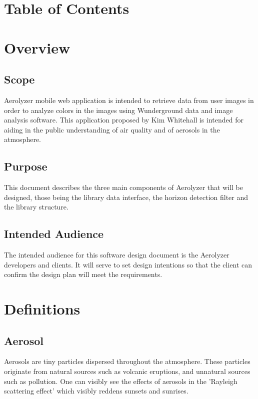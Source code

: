 \documentclass[onecolumn, draftclsnofoot,10pt, compsoc]{IEEEtran}
\begin{document}
\section{Table of Contents}
\tableofcontents


\clearpage

\begin{singlespace}
\section{Overview}
	\subsection{Scope}
		Aerolyzer mobile web application is intended to retrieve data from user images in order to analyze colors in the images using Wunderground data and image analysis software. This application proposed by Kim Whitehall is intended for aiding in the public understanding of air quality and of aerosols in the atmosphere. 
	\subsection{Purpose}
		This document describes the three main components of Aerolyzer that will be designed, those being the library data interface, the horizon detection filter and the library structure. 
	\subsection{Intended Audience}
		The intended audience for this software design document is the Aerolyzer developers and clients. It will serve to set design intentions so that the client can confirm the design plan will meet the requirements.

\section{Definitions}
	
	\subsection{Aerosol}\label{def:aerosol}
		Aerosols are tiny particles dispersed throughout the atmosphere.
		These particles originate from natural sources such as volcanic eruptions, and unnatural sources such as pollution. 
		One can visibly see the effects of aerosols in the 'Rayleigh scattering effect'  which visibly reddens sunsets and sunrises. \cite{allen_2015}
	

\end{singlespace}
\end{document}
